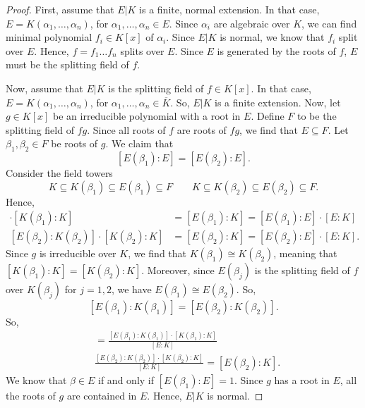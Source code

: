 \documentclass[a4paper, openany]{memoir}
\theoremstyle{definition}
\theoremstyle{plain}
\begin{document}
    \begin{proof}
        First, assume that $E|K$ is a finite, normal extension. In that case, $E = K(\alpha_1, \dots, \alpha_n)$, for $\alpha_1, \dots, \alpha_n \in E$. Since $\alpha_i$ are algebraic over $K$, we can find minimal polynomial $f_i \in K[x]$ of $\alpha_i$. Since $E|K$ is normal, we know that $f_i$ split over $E$. Hence, $f = f_1 \dots f_n$ splits over $E$. Since $E$ is generated by the roots of $f$, $E$ must be the splitting field of $f$.

        Now, assume that $E|K$ is the splitting field of $f \in K[x]$. In that case, $E = K(\alpha_1, \dots, \alpha_n)$, for $\alpha_1, \dots, \alpha_n \in \overline{K}$. So, $E|K$ is a finite extension. Now, let $g \in K[x]$ be an irreducible polynomial with a root in $E$. Define $F$ to be the splitting field of $fg$. Since all roots of $f$ are roots of $fg$, we find that $E \subseteq F$. Let $\beta_1, \beta_2 \in F$ be roots of $g$. We claim that
        \[[E(\beta_1) : E] = [E(\beta_2) : E].\]
        Consider the field towers
        \[K \subseteq K(\beta_1) \subseteq E(\beta_1) \subseteq F \qquad K \subseteq K(\beta_2) \subseteq E(\beta_2) \subseteq F.\]
        Hence,
        \begin{align*}
            [E(\beta_1) : K(\beta_1)] \cdot [K(\beta_1) : K] &= [E(\beta_1) : K] = [E(\beta_1) : E] \cdot [E : K] \\
            [E(\beta_2) : K(\beta_2)] \cdot [K(\beta_2) : K] &= [E(\beta_2) : K] = [E(\beta_2) : E] \cdot [E : K].
        \end{align*}
        Since $g$ is irreducible over $K$, we find that $K(\beta_1) \cong K(\beta_2)$, meaning that $[K(\beta_1) : K] = [K(\beta_2) : K]$. Moreover, since $E(\beta_j)$ is the splitting field of $f$ over $K(\beta_j)$ for $j = 1, 2$, we have $E(\beta_1) \cong E(\beta_2)$. So,
        \[[E(\beta_1) : K(\beta_1)] = [E(\beta_2) : K(\beta_2)].\]
        So,
        \begin{align*}
            [E(\beta_1) : E] &= \frac{[E(\beta_1) : K(\beta_1)] \cdot [K(\beta_1) : K]}{[E : K]} \\
            &\frac{[E(\beta_2) : K(\beta_2)] \cdot [K(\beta_2) : K]}{[E : K]} = [E(\beta_2) : K].
        \end{align*}
        We know that $\beta \in E$ if and only if $[E(\beta_1) : E] = 1$. Since $g$ has a root in $E$, all the roots of $g$ are contained in $E$. Hence, $E|K$ is normal.
    \end{proof}
\end{document}
